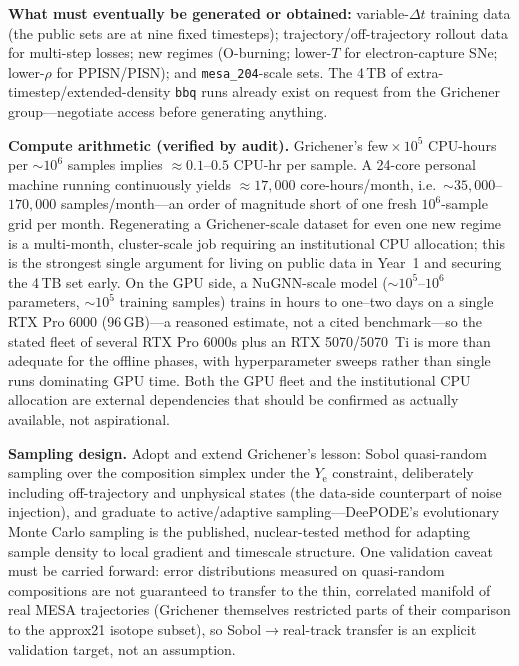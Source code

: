 \documentclass[11pt,a4paper]{article}
\newcommand{\Ye}{\ensuremath{Y_{\mathrm{e}}}}
\newcommand{\code}[1]{\texttt{#1}}
\begin{document}
\textbf{What must eventually be generated or obtained:} variable-$\Delta t$ training data (the public sets are at nine fixed timesteps); trajectory/off-trajectory rollout data for multi-step losses; new regimes (O-burning; lower-$T$ for electron-capture SNe; lower-$\rho$ for PPISN/PISN); and \code{mesa\_204}-scale sets. The 4\,TB of extra-timestep/extended-density \code{bbq} runs already exist on request from the Grichener group---negotiate access before generating anything.

\textbf{Compute arithmetic (verified by audit).} Grichener's few${}\times10^{5}$ CPU-hours per ${\sim}10^{6}$ samples implies ${\approx}0.1$--$0.5$ CPU-hr per sample. A 24-core personal machine running continuously yields ${\approx}17{,}000$ core-hours/month, i.e.\ ${\sim}35{,}000$--$170{,}000$ samples/month---an order of magnitude short of one fresh $10^{6}$-sample grid per month. Regenerating a Grichener-scale dataset for even one new regime is a multi-month, cluster-scale job requiring an institutional CPU allocation; this is the strongest single argument for living on public data in Year~1 and securing the 4\,TB set early. On the GPU side, a NuGNN-scale model (${\sim}10^{5}$--$10^{6}$ parameters, ${\sim}10^{5}$ training samples) trains in hours to one--two days on a single RTX Pro 6000 (96\,GB)---a reasoned estimate, not a cited benchmark---so the stated fleet of several RTX Pro 6000s plus an RTX 5070/5070~Ti is more than adequate for the offline phases, with hyperparameter sweeps rather than single runs dominating GPU time. Both the GPU fleet and the institutional CPU allocation are external dependencies that should be confirmed as actually available, not aspirational.

\textbf{Sampling design.} Adopt and extend Grichener's lesson: Sobol quasi-random sampling over the composition simplex under the \Ye{} constraint, deliberately including off-trajectory and unphysical states (the data-side counterpart of noise injection), and graduate to active/adaptive sampling---DeePODE's evolutionary Monte Carlo sampling is the published, nuclear-tested method for adapting sample density to local gradient and timescale structure. One validation caveat must be carried forward: error distributions measured on quasi-random compositions are not guaranteed to transfer to the thin, correlated manifold of real MESA trajectories (Grichener themselves restricted parts of their comparison to the approx21 isotope subset), so Sobol$\to$real-track transfer is an explicit validation target, not an assumption.
\end{document}

